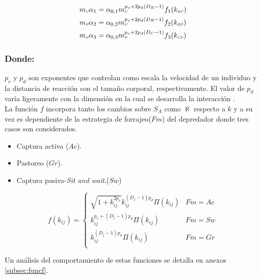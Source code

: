 \begin{equation}\label{eq:p4}
\begin{aligned}
&m_{\textit{\tiny C}} \alpha_1= \alpha_{0,1}m_{\textit{\tiny C}}^{p_v+2p_d(D_R-1)}f_1(k_{\textit{\tiny RC}})\\
&m_{\textit{\tiny P}} \alpha_2= \alpha_{0,2}m_{\textit{\tiny P}}^{p_v+2p_d(D_R-1)}f_2(k_{\textit{\tiny RP}})\\
&m_{\textit{\tiny P}} \alpha_3= \alpha_{0,3} m_{\textit{\tiny P}}^{p_v+2p_d(D_C-1)}f_3(k_{\textit{\tiny CP}})\\
\end{aligned}
\end{equation}
\subsubsection*{Donde:}
$p_v$ y $p_d$ son exponentes que controlan como escala la velocidad de un individuo  y la distancia de reacci\'on con el tama\~no corporal, respectivamente. El valor de $p_d$ var\'ia ligeramente con la dimensi\'on en la cual se desarrolla la interacci\'on \citep{pawar2012dimensionality}.\\
La funci\'on $f$ incorpora tanto los cambios sobre $S_A$ como $\aleph$ respecto a $k$ y a su vez es dependiente de la estrategia de forrajeo($Fm$) del depredador donde tres casos son considerados\citep{pawar2012dimensionality}.
\begin{itemize}
\item Captura activa ($Ac$).
\item Pastoreo ($Gr$).
\item Captura pasiva-\textit{Sit and wait}.($Sw$) 
\end{itemize}

\begin{equation}\label{eq:fkr}
f(k_{ij}) = 
\begin{cases}
\sqrt{1+k_{ij}^{2p_v}}k_{ij}^{(D_j-1)p_d} \Pi(k_{ij}) & Fm = Ac\\
k_{ij}^{p_v+(D_j-1)p_d}\Pi(k_{ij}) & Fm = Sw\\
k_{ij}^{(D_j-1)p_d}\Pi(k_{ij}) & Fm = Gr\\
\end{cases}
\end{equation}

Un an\'alisis del comportamiento de estas funciones se detalla en anexos \ref{subsec:funcf}.

